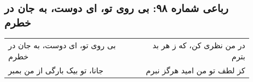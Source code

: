 \begin{center}
\section*{رباعی شماره ۹۸: بی روی تو، ای دوست، به جان در خطرم}
\label{sec:098}
\begin{longtable}{l p{0.5cm} r}
بی روی تو، ای دوست، به جان در خطرم
&&
در من نظری کن، که ز هر بد بترم
\\
جانا، تو بیک بارگی از من بمبر
&&
کز لطف تو من امید هرگز نبرم
\\
\end{longtable}
\end{center}
